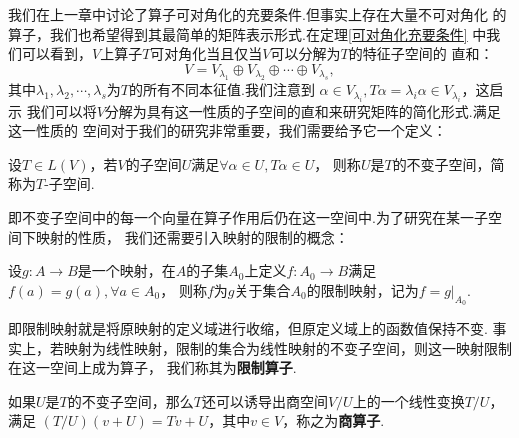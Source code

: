 我们在上一章中讨论了算子可对角化的充要条件.但事实上存在大量不可对角化
的算子，我们也希望得到其最简单的矩阵表示形式.在定理\ref{可对角化充要条件}
中我们可以看到，$V$上算子$T$可对角化当且仅当$V$可以分解为$T$的特征子空间的
直和：$$V=V_{\lambda_1}\oplus V_{\lambda_2}\oplus\cdots\oplus V_{\lambda_s},$$
其中$\lambda_1,\lambda_2,\cdots,\lambda_s$为$T$的所有不同本征值.我们注意到
$\alpha\in V_{\lambda_i},T\alpha=\lambda_i\alpha\in V_{\lambda_i}$，这启示
我们可以将$V$分解为具有这一性质的子空间的直和来研究矩阵的简化形式.满足这一性质的
空间对于我们的研究非常重要，我们需要给予它一个定义：
\begin{definition}
	设$T\in L(V)$，若$V$的子空间$U$满足$\forall \alpha\in U,T\alpha\in U$，
	则称$U$是$T$的不变子空间，简称为$T$-子空间.
\end{definition}
即不变子空间中的每一个向量在算子作用后仍在这一空间中.为了研究在某一子空间下映射的性质，
我们还需要引入映射的限制的概念：
\begin{definition}
	设$g:A\to B$是一个映射，在$A$的子集$A_0$上定义$f:A_0\to B$满足$f(a)=g(a),\forall a\in A_0$，
	则称$f$为$g$关于集合$A_0$的限制映射，记为$f=g|_{A_0}$.
\end{definition}
即限制映射就是将原映射的定义域进行收缩，但原定义域上的函数值保持不变.
事实上，若映射为线性映射，限制的集合为线性映射的不变子空间，则这一映射限制在这一空间上成为算子，
我们称其为\textbf{限制算子}.

如果$U$是$T$的不变子空间，那么$T$还可以诱导出商空间$V/U$上的一个线性变换$T/U$，满足
$(T/U)(v+U)=Tv+U$，其中$v\in V$，称之为\textbf{商算子}.

